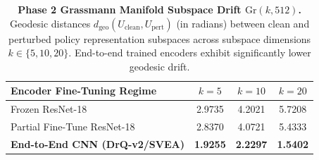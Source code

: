 \begin{table}[t]
\centering
\small
\caption{\textbf{Phase 2 Grassmann Manifold Subspace Drift $\mathrm{Gr}(k, 512)$.} Geodesic distances $d_\mathrm{geo}(U_\mathrm{clean}, U_\mathrm{pert})$ (in radians) between clean and perturbed policy representation subspaces across subspace dimensions $k \in \{5, 10, 20\}$. End-to-end trained encoders exhibit significantly lower geodesic drift.}
\label{tab:phase2_geometry}
\begin{tabular}{lccc}
\toprule
\textbf{Encoder Fine-Tuning Regime} & \textbf{$k=5$} & \textbf{$k=10$} & \textbf{$k=20$} \\
\midrule
Frozen ResNet-18 & 2.9735 & 4.2021 & 5.7208 \\
Partial Fine-Tune ResNet-18 & 2.8370 & 4.0721 & 5.4333 \\
\textbf{End-to-End CNN (DrQ-v2/SVEA)} & \textbf{1.9255} & \textbf{2.2297} & \textbf{1.5402} \\
\bottomrule
\end{tabular}
\end{table}
